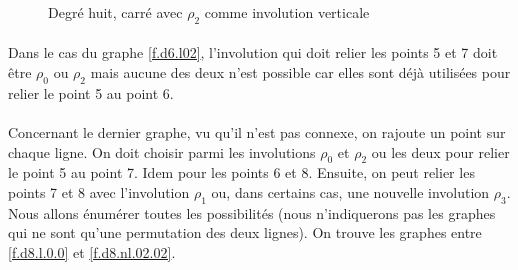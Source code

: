 \documentclass[a4paper]{article}
\theoremstyle{mytheorem}
\begin{document}
\begin{figure}[H]
  \begin{center}
  \end{center}
  \caption{Degré huit, carré avec $\rho_2$ comme involution verticale}
  \label{f.d8.l2.l}
\end{figure}

\paragraph{}
Dans le cas du graphe \ref{f.d6.l02}, l'involution qui doit relier les points 5 et 7 doit être $\rho_0$ ou $\rho_2$ mais aucune des deux n'est possible car elles sont déjà utilisées pour relier le point 5 au point 6.

\paragraph{}
Concernant le dernier graphe, vu qu'il n'est pas connexe, on rajoute un point sur chaque ligne. On doit choisir parmi les involutions $\rho_0$ et $\rho_2$ ou les deux pour relier le point 5 au point 7. Idem pour les points 6 et 8. Ensuite, on peut relier les points 7 et 8 avec l'involution $\rho_1$ ou, dans certains cas, une nouvelle involution $\rho_3$. Nous allons énumérer toutes les possibilités (nous n'indiquerons pas les graphes qui ne sont qu'une permutation des deux lignes). On trouve les graphes entre \ref{f.d8.l.0.0} et \ref{f.d8.nl.02.02}.
\end{document}
